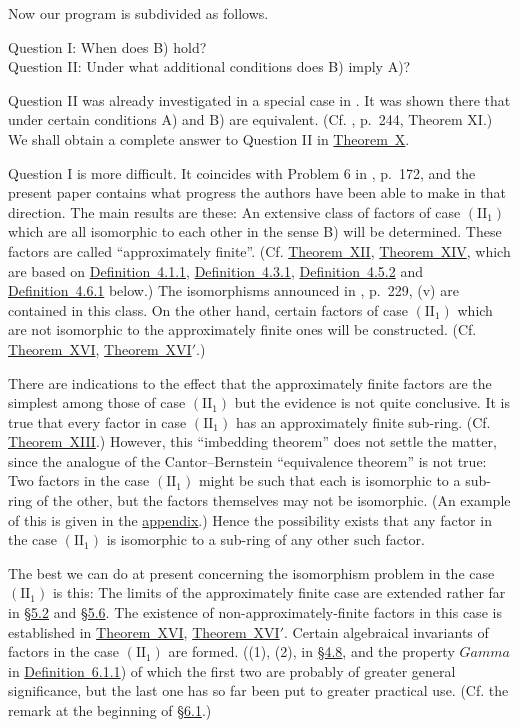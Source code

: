\documentclass[b5paper,twoside]{article}
\newcommand{\secref}[2]{\hyperref[#1]{\mbox{\S#2}}}
\newcommand{\thmref}[2]{\hyperref[#1]{\mbox{Theorem~#2}}}
\newcommand{\defref}[2]{\hyperref[#1]{\mbox{Definition~#2}}}
\theoremstyle{mvnplain}
\def\Gamma{Gamma}%
\begin{document}
Now our program is subdivided as follows.

\noindent Question I: When does B) hold?\\
Question II: Under what additional conditions does B) imply A)?

Question II was already investigated in a special case in \cite{ref6}. It was
shown there that under certain conditions A) and B) are equivalent. (Cf.
\cite{ref6}, p.~244, Theorem XI.) We shall obtain a complete answer to
Question II in \thmref{thm:X}{X}.

Question I is more difficult. It coincides with Problem 6 in \cite{ref5},
p.~172, and the present paper contains what progress the authors have been
able to make in that direction. The main results are these: An extensive class
of factors of case $(\mathrm{II}_1)$ which are all isomorphic to each other in
the sense B) will be determined. These factors are called ``approximately
finite''. (Cf. \thmref{thm:XII}{XII}, \thmref{thm:XIV}{XIV}, which are based
on \defref{def:4.1.1}{4.1.1}, \defref{def:4.3.1}{4.3.1},
\defref{def:4.5.2}{4.5.2} and \defref{def:4.6.1}{4.6.1} below.) The
isomorphisms announced in \cite{ref5}, p.~229, (v) are contained in this
class. On the other hand, certain factors of case $(\mathrm{II}_1)$ which are
not isomorphic to the approximately finite ones will be constructed. (Cf.
\thmref{thm:XVI}{XVI}, \thmref{thm:XVI-prime}{XVI$'$}.)

There are indications to the effect that the approximately finite factors are
the simplest among those of case $(\mathrm{II}_1)$ but the evidence is not
quite conclusive. It is true that every factor in case $(\mathrm{II}_1)$ has an
approximately finite sub-ring. (Cf. \thmref{thm:XIII}{XIII}.) However, this
``imbedding theorem'' does not settle the matter, since the analogue of the
Cantor--Bernstein ``equivalence theorem'' is not true: Two factors in the case
$(\mathrm{II}_1)$ might be such that each is isomorphic to a sub-ring of the
other, but the factors themselves may not be isomorphic. (An example of this
is given in the \hyperref[appendix]{appendix}.) Hence the possibility exists
that any factor in the case $(\mathrm{II}_1)$ is isomorphic to a sub-ring of
any other such factor.

The best we can do at present concerning the isomorphism problem in the case
$(\mathrm{II}_1)$ is this: The limits of the approximately finite case are
extended rather far in \secref{sec:5.2}{5.2} and \secref{sec:5.6}{5.6}. The
existence of non-approximately-finite factors in this case is established in
\thmref{thm:XVI}{XVI}, \thmref{thm:XVI-prime}{XVI$'$}. Certain algebraical
invariants of factors in the case $(\mathrm{II}_1)$ are formed. ((1), (2), in
\secref{sec:4.8}{4.8}, and the property $\Gamma$ in
\defref{def:6.1.1}{6.1.1}) of which the first two are probably of greater
general significance, but the last one has so far been put to greater
practical use. (Cf. the remark at the beginning of \secref{sec:6.1}{6.1}.)
\end{document}
